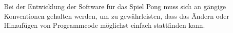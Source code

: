 Bei der Entwicklung der Software für das Spiel Pong \gls{muss} sich an gängige Konventionen gehalten werden, um zu gewährleisten, dass das Ändern oder Hinzufügen von Programmcode möglichst einfach stattfinden kann. 